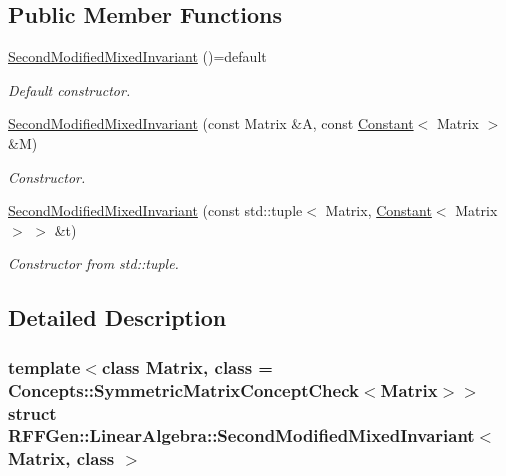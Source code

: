 \subsection*{Public Member Functions}
\begin{DoxyCompactItemize}
\item 
\hypertarget{structRFFGen_1_1LinearAlgebra_1_1SecondModifiedMixedInvariant_a616648819b50566888bbd3ecce020db0}{\hyperlink{structRFFGen_1_1LinearAlgebra_1_1SecondModifiedMixedInvariant_a616648819b50566888bbd3ecce020db0}{Second\-Modified\-Mixed\-Invariant} ()=default}\label{structRFFGen_1_1LinearAlgebra_1_1SecondModifiedMixedInvariant_a616648819b50566888bbd3ecce020db0}

\begin{DoxyCompactList}\small\item\em Default constructor. \end{DoxyCompactList}\item 
\hyperlink{structRFFGen_1_1LinearAlgebra_1_1SecondModifiedMixedInvariant_aa23bb41771ecbde5618a83dfb2555ecd}{Second\-Modified\-Mixed\-Invariant} (const Matrix \&A, const \hyperlink{structRFFGen_1_1Constant}{Constant}$<$ Matrix $>$ \&M)
\begin{DoxyCompactList}\small\item\em Constructor. \end{DoxyCompactList}\item 
\hyperlink{structRFFGen_1_1LinearAlgebra_1_1SecondModifiedMixedInvariant_aabe601389efe990b50642f63508742c1}{Second\-Modified\-Mixed\-Invariant} (const std\-::tuple$<$ Matrix, \hyperlink{structRFFGen_1_1Constant}{Constant}$<$ Matrix $>$ $>$ \&t)
\begin{DoxyCompactList}\small\item\em Constructor from std\-::tuple. \end{DoxyCompactList}\end{DoxyCompactItemize}


\subsection{Detailed Description}
\subsubsection*{template$<$class Matrix, class = Concepts\-::\-Symmetric\-Matrix\-Concept\-Check$<$\-Matrix$>$$>$struct R\-F\-F\-Gen\-::\-Linear\-Algebra\-::\-Second\-Modified\-Mixed\-Invariant$<$ Matrix, class $>$}


